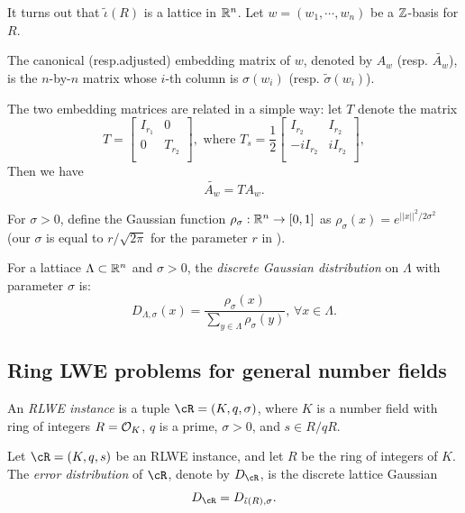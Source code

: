 \documentclass{amsart}
\begin{document}
It turns out that $\tilde{\iota}(R)$ is a lattice in $\mathbb{R}^n$. Let $w = (w_1, \cdots , w_n)$ be a $\mathbb{Z}$-basis for $R$.

\begin{Definition}
The canonical (resp.adjusted) embedding matrix of $w$, denoted by $A_w$ (resp. $\tilde{A_w}$), is the $n$-by-$n$ matrix whose $i$-th column is $\sigma(w_i)$ (resp. $\tilde{\sigma}(w_i)$).
\end{Definition}

The two embedding matrices are related in a simple way:
let $T$ denote the matrix
\[
T = \begin{bmatrix}
    I_{r_1}  & 0  \\
    0     & T_{r_2} \\
\end{bmatrix},
\mbox{ where } T_s = \frac{1}{2} \begin{bmatrix}
    I_{r_2}  & I_{r_2} \\
    -iI_{r_2}     & iI_{r_2} \\
\end{bmatrix},
\]
Then we have
$$\tilde{A_{w}} = T A_{w}.$$


For $\sigma > 0$, define the Gaussian function $\rho_\sigma: \mathbb{R}^n \to [0,1]$ as $\rho_\sigma(x) = e^{||x||^2/2\sigma^2}$ (our $\sigma$ is equal to $r/\sqrt{2\pi}$ for the parameter $r$ in \cite{lyubashevsky2013ideal}).
\begin{Definition}
For a lattiace $\Lambda \subset \mathbb{R}^n$ and $\sigma > 0$, the {\it discrete Gaussian distribution} on $\Lambda$ with parameter $\sigma$ is:
\[
    D_{\Lambda, \sigma}(x) = \frac{\rho_\sigma(x)}{\sum_{y \in\Lambda} \rho_\sigma(y)}, \, \forall x \in \Lambda.
\]

\end{Definition}


\subsection{Ring LWE problems for general number fields}

\begin{Definition}
An {\it RLWE instance} is a tuple $\cR = (K,q,\sigma)$, where $K$ is a number field with ring of integers $R = \mathcal{O}_K$, $q$ is a prime, $\sigma >0$, and $s \in R/qR$.
\end{Definition}


\begin{Definition}
Let $\cR = (K,q,s)$ be an RLWE instance, and let $R$ be the ring of integers of $K$. The {\it error distribution} of $\cR$, denote by $D_\cR$, is the discrete lattice Gaussian
\[
D_\cR = D_{\tilde{\iota}(R),\sigma}.
\]
\end{Definition}
\end{document}
